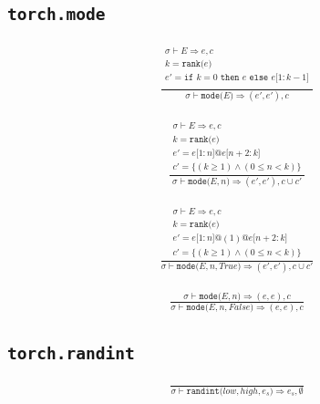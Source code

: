\documentclass{article}
\makeatletter
\newcommand{\Rar}{\Rightarrow}
\newcommand{\mtt}[1]{\mathtt{#1}}
\newcommand{\op}[2]{\mtt{#1(}#2\mtt{)}}
\newcommand{\conc}{\mtt{@}}
\newcommand{\indr}[2]{\mtt{[}#1\mtt{:}#2\mtt{]}}
\newcommand{\ifs}[3]{\mtt{if}\,\,#1\,\,\mtt{then}\,\,#2\,\,\mtt{else}\,\,#3}
\makeatother
\begin{document}
\subsection*{\texttt{torch.mode}}%
\begin{align*}
  \frac
  {
    \begin{array}{l}
      \sigma \vdash E \Rar e, c \\
      k = \op{rank}{e} \\
      e' = \ifs{k = 0}{e}{e \indr{1}{k-1}} \\
    \end{array}
  }
  {
    \sigma \vdash \op{mode}{E} \Rar (e', e'), c
  }
  \tag*{tuple 형태로 반환}
\end{align*}

\begin{align*}
  \frac
  {
    \begin{array}{l}
      \sigma \vdash E \Rar e, c \\
      k = \op{rank}{e} \\
      e' = e \indr{1}{n} \conc e \indr{n+2}{k} \\
      c' = \{ (k \geq 1) \land (0 \leq n < k) \}
    \end{array}
  }
  {
    \sigma \vdash \op{mode}{E, n} \Rar (e', e'), c \cup c'
  }
  \tag*{tuple 형태로 반환}
\end{align*}

\begin{align*}
  \frac
  {
    \begin{array}{l}
      \sigma \vdash E \Rar e, c \\
      k = \op{rank}{e} \\
      e' = e \indr{1}{n} \conc (1) \conc e \indr{n+2}{k} \\
      c' = \{ (k \geq 1) \land (0 \leq n < k) \}
    \end{array}
  }
  {
    \sigma \vdash \op{mode}{E, n, True} \Rar (e', e'), c \cup c'
  }
  \tag*{tuple 형태로 반환}
\end{align*}

\begin{align*}
  \frac
  {
    \sigma \vdash \op{mode}{E, n} \Rar (e, e), c
  }
  {
    \sigma \vdash \op{mode}{E, n, False} \Rar (e, e), c
  }
  \tag*{tuple 형태로 반환}
\end{align*}%

\subsection*{\texttt{torch.randint}}%
\begin{align*}
  \frac
  {
  }
  {
    \sigma \vdash \op{randint}{low, high, e_s} \Rar e_s, \emptyset
  }
\end{align*}
\end{document}
